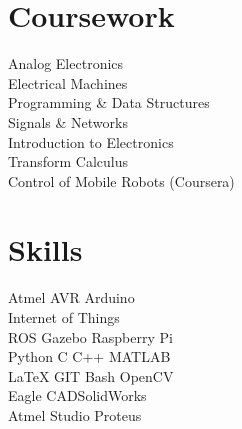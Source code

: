 \documentclass[letterpaper]{deedy-resume} %
\begin{document}
\begin{minipage}[t]{0.33\textwidth}

\section{Coursework}


Analog Electronics\\
Electrical Machines\\
Programming \& Data Structures\\
Signals \& Networks\\
Introduction to Electronics\\
Transform Calculus\\


Control of Mobile Robots (Coursera)\\

\sectionspace %


\section{Skills}

Atmel AVR \textbullet{} Arduino \textbullet{}\\ Internet of Things \textbullet{} \\ROS  \textbullet{} Gazebo \textbullet{} Raspberry Pi\\
\sectionspace
{}
Python \textbullet{} C  \textbullet{} C++\textbullet{} MATLAB \textbullet{} \\ \LaTeX \textbullet{} GIT \textbullet{} Bash \textbullet OpenCV\\
\sectionspace
{}
Eagle CAD\textbullet SolidWorks \textbullet\\ Atmel Studio \textbullet Proteus



\end{minipage}
\end{document}
